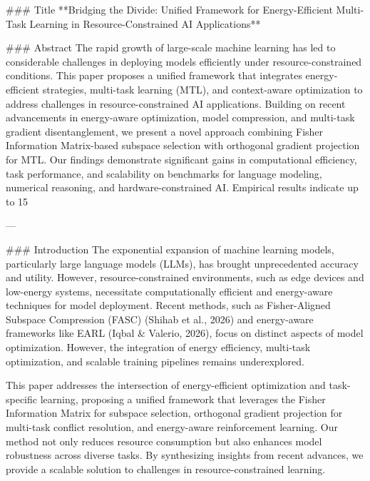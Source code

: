 ### Title
**Bridging the Divide: Unified Framework for Energy-Efficient Multi-Task Learning in Resource-Constrained AI Applications**

### Abstract
The rapid growth of large-scale machine learning has led to considerable challenges in deploying models efficiently under resource-constrained conditions. This paper proposes a unified framework that integrates energy-efficient strategies, multi-task learning (MTL), and context-aware optimization to address challenges in resource-constrained AI applications. Building on recent advancements in energy-aware optimization, model compression, and multi-task gradient disentanglement, we present a novel approach combining Fisher Information Matrix-based subspace selection with orthogonal gradient projection for MTL. Our findings demonstrate significant gains in computational efficiency, task performance, and scalability on benchmarks for language modeling, numerical reasoning, and hardware-constrained AI. Empirical results indicate up to 15%

---

### Introduction
The exponential expansion of machine learning models, particularly large language models (LLMs), has brought unprecedented accuracy and utility. However, resource-constrained environments, such as edge devices and low-energy systems, necessitate computationally efficient and energy-aware techniques for model deployment. Recent methods, such as Fisher-Aligned Subspace Compression (FASC) (Shihab et al., 2026) and energy-aware frameworks like EARL (Iqbal & Valerio, 2026), focus on distinct aspects of model optimization. However, the integration of energy efficiency, multi-task optimization, and scalable training pipelines remains underexplored.

This paper addresses the intersection of energy-efficient optimization and task-specific learning, proposing a unified framework that leverages the Fisher Information Matrix for subspace selection, orthogonal gradient projection for multi-task conflict resolution, and energy-aware reinforcement learning. Our method not only reduces resource consumption but also enhances model robustness across diverse tasks. By synthesizing insights from recent advances, we provide a scalable solution to challenges in resource-constrained learning.


